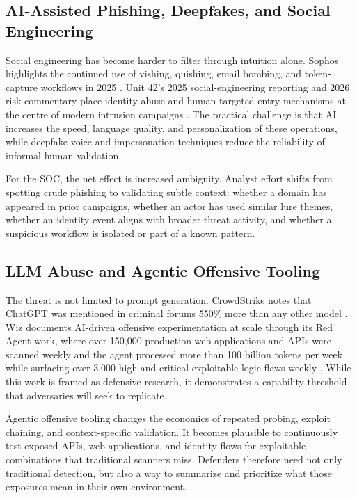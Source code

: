 \subsection{AI-Assisted Phishing, Deepfakes, and Social Engineering}
Social engineering has become harder to filter through intuition alone. Sophos highlights the continued use of vishing, quishing, email bombing, and token-capture workflows in 2025 \cite{sophos_threat_2025}. Unit 42's 2025 social-engineering reporting and 2026 risk commentary place identity abuse and human-targeted entry mechanisms at the centre of modern intrusion campaigns \cite{unit42_ir_2026}. The practical challenge is that AI increases the speed, language quality, and personalization of these operations, while deepfake voice and impersonation techniques reduce the reliability of informal human validation.

For the SOC, the net effect is increased ambiguity. Analyst effort shifts from spotting crude phishing to validating subtle context: whether a domain has appeared in prior campaigns, whether an actor has used similar lure themes, whether an identity event aligns with broader threat activity, and whether a suspicious workflow is isolated or part of a known pattern.

\subsection{LLM Abuse and Agentic Offensive Tooling}
The threat is not limited to prompt generation. CrowdStrike notes that ChatGPT was mentioned in criminal forums 550\% more than any other model \cite{crowdstrike_gtr_2026}. Wiz documents AI-driven offensive experimentation at scale through its Red Agent work, where over 150,000 production web applications and APIs were scanned weekly and the agent processed more than 100 billion tokens per week while surfacing over 3,000 high and critical exploitable logic flaws weekly \cite{wiz_ai_readiness_2026}. While this work is framed as defensive research, it demonstrates a capability threshold that adversaries will seek to replicate.

Agentic offensive tooling changes the economics of repeated probing, exploit chaining, and context-specific validation. It becomes plausible to continuously test exposed APIs, web applications, and identity flows for exploitable combinations that traditional scanners miss. Defenders therefore need not only traditional detection, but also a way to summarize and prioritize what those exposures mean in their own environment.


